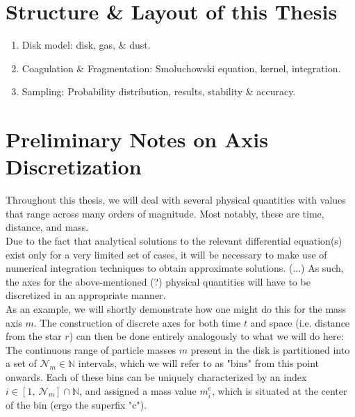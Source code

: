 \section{Structure \& Layout of this Thesis}

    \begin{enumerate}
        \item Disk model: disk, gas, \& dust.
        \item Coagulation \& Fragmentation: Smoluchowski equation, kernel, integration.
        \item Sampling: Probability distribution, results, stability \& accuracy.
    \end{enumerate}

\newpage
\section{Preliminary Notes on Axis Discretization}

    Throughout this thesis, we will deal with several physical quantities with values that range
    across many orders of magnitude. Most notably, these are time, distance, and mass. \\

    Due to the fact that analytical solutions to the relevant differential equation(s) exist only 
    for a very limited set of cases, it will be necessary to make use of numerical integration 
    techniques to obtain approximate solutions. (...)
    As such, the axes for the above-mentioned (?) physical quantities
    will have to be discretized in an appropriate manner. \\

    As an example, we will shortly demonstrate how one might do this for the mass axis $m$.
    The construction of discrete axes for both time $t$ and space (i.e. distance from the star $r$)
    can then be done entirely analogously to what we will do here: \\

    The continuous range of particle masses $m$ present in the disk is partitioned into a set of 
    $\mathcal N_m\in\mathbb N$ intervals, which we will refer to as "bins" from this point onwards. 
    Each of these bins can be uniquely characterized by an index 
    $i\in[1,\ \mathcal N_m]\cap\mathbb N$, and assigned a mass value $m_i^\text{c}$, 
    which is situated at the center of the bin (ergo the superfix "c").\\
    
